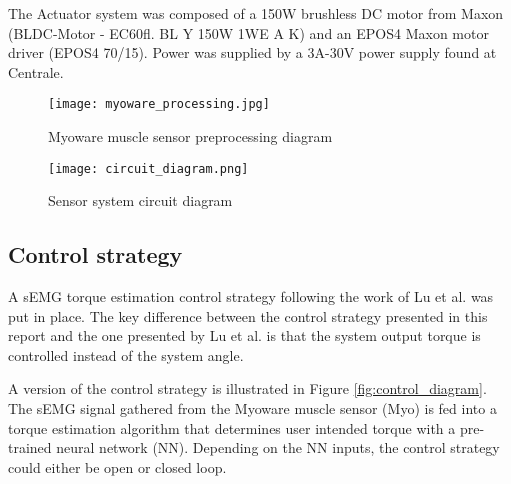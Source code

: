 The Actuator system was composed of a 150W brushless DC motor from Maxon 
(BLDC-Motor - EC60fl. BL Y 150W 1WE A K) and an EPOS4 Maxon motor driver 
(EPOS4 70/15). Power was supplied by a 3A-30V power supply found at Centrale. 

\begin{figure}[htbp]
  \centering
  \texttt{[image: myoware\_processing.jpg]}
  \caption{Myoware muscle sensor preprocessing diagram}
  \label{fig:myoware_processing}
\end{figure}
\begin{figure}[htbp]
  \centering
  \texttt{[image: circuit\_diagram.png]}
  \caption{Sensor system circuit diagram}
  \label{fig:circuit_diagram}
\end{figure}
\FloatBarrier

\subsection{Control strategy}
A sEMG torque estimation control strategy following the work of Lu et al. 
\cite{lu_development_2019} was put in place. The key difference between the 
control strategy presented in this report and the one presented by Lu et al. 
is that the system output torque is controlled instead of the system angle.  

A version of the control strategy is illustrated in Figure \ref{fig:control_diagram}. 
The sEMG signal gathered from the Myoware muscle sensor (Myo) is fed into a 
torque estimation algorithm that determines user intended torque with a pre-trained 
neural network (NN). Depending on the NN inputs, the control strategy could either be 
open or closed loop.  

